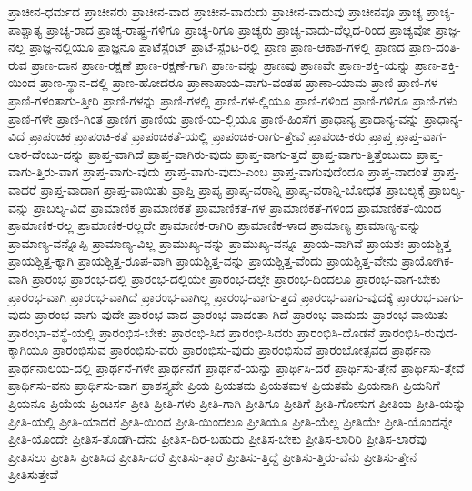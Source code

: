 {ಪ್ರಾಚೀನ-ಧರ್ಮದ
ಪ್ರಾಚೀನರು
ಪ್ರಾಚೀನ-ವಾದ
ಪ್ರಾಚೀನ-ವಾದುದು
ಪ್ರಾಚೀನ-ವಾದುವು
ಪ್ರಾಚೀನವೂ
ಪ್ರಾಚ್ಯ
ಪ್ರಾಚ್ಯ-ಪಾಶ್ಚಾತ್ಯ
ಪ್ರಾಚ್ಯ-ರಾದ
ಪ್ರಾಚ್ಯ-ರಾಷ್ಟ್ರ-ಗಳಿಗೂ
ಪ್ರಾಚ್ಯ-ರಿಗೂ
ಪ್ರಾಚ್ಯರು
ಪ್ರಾಚ್ಯ-ವಾದು-ದೆಲ್ಲದ-ರಿಂದ
ಪ್ರಾಚ್ಯವೋ
ಪ್ರಾಜ್ಞ-ನಲ್ಲ
ಪ್ರಾಜ್ಞ-ನಲ್ಲಿಯೂ
ಪ್ರಾಜ್ಞನೂ
ಪ್ರಾಟೆಸ್ಟೆಂಟ್
ಪ್ರಾಟೆ-ಸ್ಟೆಂಟ-ರಲ್ಲಿ
ಪ್ರಾಣ
ಪ್ರಾಣ-ಆಕಾಶ-ಗಳಲ್ಲಿ
ಪ್ರಾಣದ
ಪ್ರಾಣ-ದಂತಿ-ರುವ
ಪ್ರಾಣ-ದಾನ
ಪ್ರಾಣ-ರಕ್ಷಣೆ
ಪ್ರಾಣ-ರಕ್ಷಣೆ-ಗಾಗಿ
ಪ್ರಾಣ-ವನ್ನು
ಪ್ರಾಣವು
ಪ್ರಾಣವೇ
ಪ್ರಾಣ-ಶಕ್ತಿ-ಯನ್ನು
ಪ್ರಾಣ-ಶಕ್ತಿ-ಯಿಂದ
ಪ್ರಾಣ-ಸ್ಥಾನ-ದಲ್ಲಿ
ಪ್ರಾಣ-ಹೋದರೂ
ಪ್ರಾಣಾಪಾಯ-ವಾಗು-ವಂತಹ
ಪ್ರಾಣಾ-ಯಾಮ
ಪ್ರಾಣಿ
ಪ್ರಾಣಿ-ಗಳ
ಪ್ರಾಣಿ-ಗಳಂತಾಗು-ತ್ತೀರಿ
ಪ್ರಾಣಿ-ಗಳನ್ನು
ಪ್ರಾಣಿ-ಗಳಲ್ಲಿ
ಪ್ರಾಣಿ-ಗಳ-ಲ್ಲಿಯೂ
ಪ್ರಾಣಿ-ಗಳಿಂದ
ಪ್ರಾಣಿ-ಗಳಿಗೂ
ಪ್ರಾಣಿ-ಗಳು
ಪ್ರಾಣಿ-ಗಳೇ
ಪ್ರಾಣಿ-ಗಿಂತ
ಪ್ರಾಣಿಗೆ
ಪ್ರಾಣಿಯ
ಪ್ರಾಣಿ-ಯ-ಲ್ಲಿಯೂ
ಪ್ರಾಣಿ-ಹಿಂಸೆಗೆ
ಪ್ರಾಧಾನ್ಯ
ಪ್ರಾಧಾನ್ಯ-ವನ್ನು
ಪ್ರಾಧಾನ್ಯ-ವಿದೆ
ಪ್ರಾಪಂಚಿಕ
ಪ್ರಾಪಂಚಿ-ಕತೆ
ಪ್ರಾಪಂಚಿಕತೆ-ಯಲ್ಲಿ
ಪ್ರಾಪಂಚಿಕ-ರಾಗು-ತ್ತೇವೆ
ಪ್ರಾಪಂಚಿ-ಕರು
ಪ್ರಾಪ್ತ
ಪ್ರಾಪ್ತ-ವಾಗ-ಲಾರ-ದೆಂಬು-ದನ್ನು
ಪ್ರಾಪ್ತ-ವಾಗಿದೆ
ಪ್ರಾಪ್ತ-ವಾಗಿರು-ವುದು
ಪ್ರಾಪ್ತ-ವಾಗು-ತ್ತದೆ
ಪ್ರಾಪ್ತ-ವಾಗು-ತ್ತಿತ್ತೆಂಬುದು
ಪ್ರಾಪ್ತ-ವಾಗು-ತ್ತಿರು-ವಾಗ
ಪ್ರಾಪ್ತ-ವಾಗು-ವುದು
ಪ್ರಾಪ್ತ-ವಾಗು-ವುದು-ಎಂಬ
ಪ್ರಾಪ್ತ-ವಾಗುವುದೆಂದೂ
ಪ್ರಾಪ್ತ-ವಾದಂತೆ
ಪ್ರಾಪ್ತ-ವಾದರೆ
ಪ್ರಾಪ್ತ-ವಾದಾಗ
ಪ್ರಾಪ್ತ-ವಾಯಿತು
ಪ್ರಾಪ್ತಿ
ಪ್ರಾಪ್ಯ
ಪ್ರಾಪ್ಯ-ವರಾನ್ನಿ
ಪ್ರಾಪ್ಯ-ವರಾನ್ನಿ-ಬೋಧತ
ಪ್ರಾಬಲ್ಯಕ್ಕೆ
ಪ್ರಾಬಲ್ಯ-ವನ್ನು
ಪ್ರಾಬಲ್ಯ-ವಿದೆ
ಪ್ರಾಮಾಣಿಕ
ಪ್ರಾಮಾಣಿಕತೆ
ಪ್ರಾಮಾಣಿಕತೆ-ಗಳ
ಪ್ರಾಮಾಣಿಕತೆ-ಗಳಿಂದ
ಪ್ರಾಮಾಣಿಕತೆ-ಯಿಂದ
ಪ್ರಾಮಾಣಿಕ-ರಲ್ಲ
ಪ್ರಾಮಾಣಿಕ-ರಲ್ಲದೇ
ಪ್ರಾಮಾಣಿಕ-ರಾಗಿರಿ
ಪ್ರಾಮಾಣಿಕ-ಳಾದ
ಪ್ರಾಮಾಣ್ಯ
ಪ್ರಾಮಾಣ್ಯ-ವನ್ನು
ಪ್ರಾಮಾಣ್ಯ-ವನ್ನೊಪ್ಪಿ
ಪ್ರಾಮಾಣ್ಯ-ವಿಲ್ಲ
ಪ್ರಾಮುಖ್ಯ-ವನ್ನು
ಪ್ರಾಮುಖ್ಯ-ವನ್ನೂ
ಪ್ರಾಯ-ವಾಗಿವೆ
ಪ್ರಾಯಶಃ
ಪ್ರಾಯಶ್ಚಿತ್ತ
ಪ್ರಾಯಶ್ಚಿತ್ತ-ಕ್ಕಾಗಿ
ಪ್ರಾಯಶ್ಚಿತ್ತ-ರೂಪ-ವಾಗಿ
ಪ್ರಾಯಶ್ಚಿತ್ತ-ವನ್ನು
ಪ್ರಾಯಶ್ಚಿತ್ತ-ವೆಂದು
ಪ್ರಾಯಶ್ಚಿತ್ತ-ವೇನು
ಪ್ರಾಯೋಗಿಕ-ವಾಗಿ
ಪ್ರಾರಂಭ
ಪ್ರಾರಂಭ-ದಲ್ಲಿ
ಪ್ರಾರಂಭ-ದಲ್ಲಿಯೇ
ಪ್ರಾರಂಭ-ದಲ್ಲೇ
ಪ್ರಾರಂಭ-ದಿಂದಲೂ
ಪ್ರಾರಂಭ-ವಾಗ-ಬೇಕು
ಪ್ರಾರಂಭ-ವಾಗಿ
ಪ್ರಾರಂಭ-ವಾಗಿದೆ
ಪ್ರಾರಂಭ-ವಾಗಿಲ್ಲ
ಪ್ರಾರಂಭ-ವಾಗು-ತ್ತದೆ
ಪ್ರಾರಂಭ-ವಾಗು-ವುದಕ್ಕೆ
ಪ್ರಾರಂಭ-ವಾಗು-ವುದು
ಪ್ರಾರಂಭ-ವಾಗು-ವುದೇ
ಪ್ರಾರಂಭ-ವಾದ
ಪ್ರಾರಂಭ-ವಾದಂತಾ-ಗಿದೆ
ಪ್ರಾರಂಭ-ವಾದುದು
ಪ್ರಾರಂಭ-ವಾಯಿತು
ಪ್ರಾರಂಭಾ-ವಸ್ಥೆ-ಯಲ್ಲಿ
ಪ್ರಾರಂಭಿಸ-ಬೇಕು
ಪ್ರಾರಂಭಿ-ಸಿದ
ಪ್ರಾರಂಭಿ-ಸಿದರು
ಪ್ರಾರಂಭಿಸಿ-ದೊಡನೆ
ಪ್ರಾರಂಭಿಸಿ-ರುವುದ-ಕ್ಕಾಗಿಯೂ
ಪ್ರಾರಂಭಿಸುವ
ಪ್ರಾರಂಭಿಸು-ವರು
ಪ್ರಾರಂಭಿಸು-ವುದು
ಪ್ರಾರಂಭಿಸುವೆ
ಪ್ರಾರಂಭೋತ್ಸವದ
ಪ್ರಾರ್ಥನಾ
ಪ್ರಾರ್ಥನಾಲಯ-ದಲ್ಲಿ
ಪ್ರಾರ್ಥನೆ-ಗಳೇ
ಪ್ರಾರ್ಥನೆಗೆ
ಪ್ರಾರ್ಥನೆ-ಯನ್ನು
ಪ್ರಾರ್ಥಿಸಿ-ದರೆ
ಪ್ರಾರ್ಥಿಸು-ತ್ತೇನೆ
ಪ್ರಾರ್ಥಿಸು-ತ್ತೇವೆ
ಪ್ರಾರ್ಥಿಸು-ವನು
ಪ್ರಾರ್ಥಿಸು-ವಾಗ
ಪ್ರಾಶಸ್ತ್ಯವೇ
ಪ್ರಿಯ
ಪ್ರಿಯತಮ
ಪ್ರಿಯತಮಳ
ಪ್ರಿಯತಮೆ
ಪ್ರಿಯನಾಗಿ
ಪ್ರಿಯನಿಗೆ
ಪ್ರಿಯನೂ
ಪ್ರಿಯೆಯ
ಪ್ರಿಂಟರ್ಸ
ಪ್ರೀತಿ
ಪ್ರೀತಿ-ಗಳು
ಪ್ರೀತಿ-ಗಾಗಿ
ಪ್ರೀತಿಗೂ
ಪ್ರೀತಿಗೆ
ಪ್ರೀತಿ-ಗೋಸುಗ
ಪ್ರೀತಿಯ
ಪ್ರೀತಿ-ಯನ್ನು
ಪ್ರೀತಿ-ಯಲ್ಲಿ
ಪ್ರೀತಿ-ಯಾದರೆ
ಪ್ರೀತಿ-ಯಿಂದ
ಪ್ರೀತಿ-ಯಿಂದಲೂ
ಪ್ರೀತಿಯೂ
ಪ್ರೀತಿ-ಯೆಲ್ಲ
ಪ್ರೀತಿಯೇ
ಪ್ರೀತಿ-ಯೊಂದನ್ನೇ
ಪ್ರೀತಿ-ಯೊಂದೇ
ಪ್ರೀತಿಸ-ತೊಡಗಿ-ದೆನು
ಪ್ರೀತಿಸ-ದಿರ-ಬಹುದು
ಪ್ರೀತಿಸ-ಬೇಕು
ಪ್ರೀತಿಸ-ಲಾರಿರಿ
ಪ್ರೀತಿಸ-ಲಾರೆವು
ಪ್ರೀತಿಸಲು
ಪ್ರೀತಿಸಿ
ಪ್ರೀತಿಸಿದ
ಪ್ರೀತಿಸಿ-ದರೆ
ಪ್ರೀತಿಸು-ತ್ತಾರೆ
ಪ್ರೀತಿಸು-ತ್ತಿದ್ದೆ
ಪ್ರೀತಿಸು-ತ್ತಿರು-ವೆನು
ಪ್ರೀತಿಸು-ತ್ತೇನೆ
ಪ್ರೀತಿಸುತ್ತೇವೆ
}
